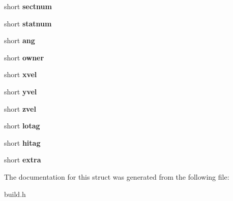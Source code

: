 \begin{DoxyCompactItemize}
\item 
short {\bfseries sectnum}\label{structspritetype_a3e3e952d84025d6d18d59f6dbd79786b}

\item 
short {\bfseries statnum}\label{structspritetype_ae3cd30b4f6f60ed2f0b68647438e1f1f}

\item 
short {\bfseries ang}\label{structspritetype_a91071624b6aedda57af736d9c5fafcdd}

\item 
short {\bfseries owner}\label{structspritetype_a6f30e1219bbd4851ccf100a6dd991c22}

\item 
short {\bfseries xvel}\label{structspritetype_a0100369aeb42da1d2d7267f76e179b40}

\item 
short {\bfseries yvel}\label{structspritetype_a04ca8937796f5b92e5e14fe37cb0ea2c}

\item 
short {\bfseries zvel}\label{structspritetype_ac5dadd8763374e8ac9151a22a6e0ea5e}

\item 
short {\bfseries lotag}\label{structspritetype_af47dc4f3a389a8cdce587c1acacc2e09}

\item 
short {\bfseries hitag}\label{structspritetype_ac2596d3368a4ff0c6ff245fe79310472}

\item 
short {\bfseries extra}\label{structspritetype_ae22ec2d69702bb897fdd38f160e02879}

\end{DoxyCompactItemize}


The documentation for this struct was generated from the following file\-:\begin{DoxyCompactItemize}
\item 
build.\-h\end{DoxyCompactItemize}
